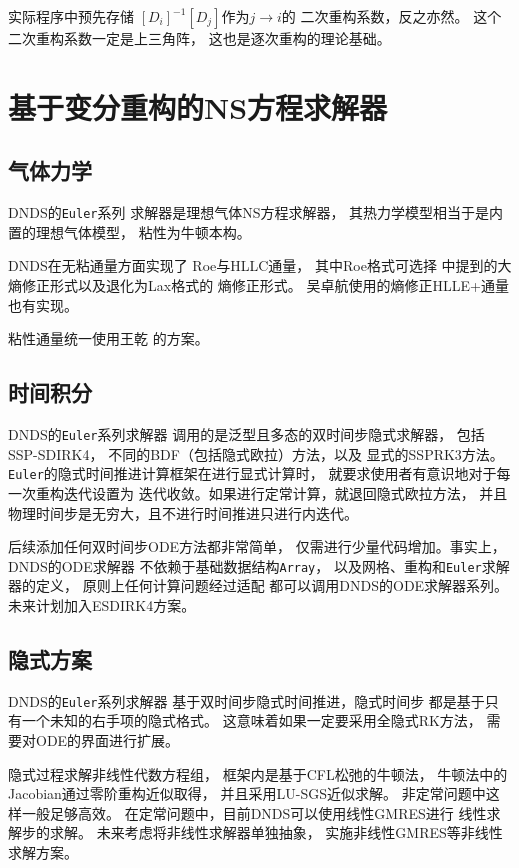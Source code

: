\documentclass[UTF8,zihao=5]{ctexart} %
\begin{document}
实际程序中预先存储
$[D_i]^{-1}[D_j]$作为$j\rightarrow i$的
二次重构系数，反之亦然。
这个二次重构系数一定是上三角阵，
这也是逐次重构的理论基础。



\section{基于变分重构的NS方程求解器}

\subsection{气体力学}

DNDS的\verb|Euler|系列
求解器是理想气体NS方程求解器，
其热力学模型相当于是内置的理想气体模型，
粘性为牛顿本构。

DNDS在无粘通量方面实现了
Roe与HLLC通量\cite{toro2013Riemann}，
其中Roe格式可选择\cite{fleischmann2020low}
中提到的大熵修正形式以及退化为Lax格式的
熵修正形式。
吴卓航使用的熵修正HLLE+通量也有实现。

粘性通量统一使用王乾
的方案\cite{wang2016compact2}。

\subsection{时间积分}

DNDS的\verb|Euler|系列求解器
调用的是泛型且多态的双时间步隐式求解器，
包括SSP-SDIRK4\cite{ferracina2008strong}，
不同的BDF（包括隐式欧拉）方法，以及
显式的SSPRK3方法。
\verb|Euler|的隐式时间推进计算框架在进行显式计算时，
就要求使用者有意识地对于每一次重构迭代设置为
迭代收敛。如果进行定常计算，就退回隐式欧拉方法，
并且物理时间步是无穷大，且不进行时间推进只进行内迭代。

后续添加任何双时间步ODE方法都非常简单，
仅需进行少量代码增加。事实上，DNDS的ODE求解器
不依赖于基础数据结构\verb|Array|，
以及网格、重构和\verb|Euler|求解器的定义，
原则上任何计算问题经过适配
都可以调用DNDS的ODE求解器系列。
未来计划加入ESDIRK4方案。

\subsection{隐式方案}

DNDS的\verb|Euler|系列求解器
基于双时间步隐式时间推进，隐式时间步
都是基于只有一个未知的右手项的隐式格式。
这意味着如果一定要采用全隐式RK方法，
需要对ODE的界面进行扩展。

隐式过程求解非线性代数方程组，
框架内是基于CFL松弛的牛顿法，
牛顿法中的Jacobian通过零阶重构近似取得，
并且采用LU-SGS近似求解。
非定常问题中这样一般足够高效。
在定常问题中，目前DNDS可以使用线性GMRES进行
线性求解步的求解。
未来考虑将非线性求解器单独抽象，
实施非线性GMRES等非线性求解方案。
\end{document}
